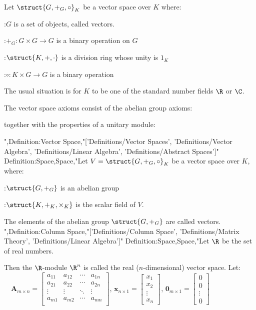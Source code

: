 Let $\struct {G, +_G, \circ}_K$ be a vector space over $K$ where:

:$G$ is a set of objects, called vectors.

:$+_G: G \times G \to G$ is a binary operation on $G$

:$\struct {K, +, \cdot}$ is a division ring whose unity is $1_K$

:$\circ: K \times G \to G$ is a binary operation

The usual situation is for $K$ to be one of the standard number fields $\R$ or $\C$.


The vector space axioms consist of the abelian group axioms:










together with the properties of a unitary module:







",Definition:Vector Space,"['Definitions/Vector Spaces', 'Definitions/Vector Algebra', 'Definitions/Linear Algebra', 'Definitions/Abstract Spaces']"
Definition:Space,Space,"Let $V = \struct {G, +_G, \circ}_K$ be a vector space over $K$, where:

:$\struct {G, +_G}$ is an abelian group

:$\struct {K, +_K, \times_K}$ is the scalar field of $V$.


The elements of the abelian group $\struct {G, +_G}$ are called vectors.
",Definition:Column Space,"['Definitions/Column Space', 'Definitions/Matrix Theory', 'Definitions/Linear Algebra']"
Definition:Space,Space,"Let $\R$ be the set of real numbers.


Then the $\R$-module $\R^n$ is called the real ($n$-dimensional) vector space.
Let:
$\quad \mathbf A_{m \times n} = \begin {bmatrix}
a_{11} & a_{12} & \cdots & a_{1n} \\
a_{21} & a_{22} & \cdots & a_{2n} \\
\vdots & \vdots & \ddots & \vdots \\
a_{m1} & a_{m2} & \cdots & a_{mn} \\
\end {bmatrix}$,  $\mathbf x_{n \times 1} = \begin {bmatrix} x_1 \\ x_2 \\ \vdots \\ x_n \end {bmatrix}$, $\mathbf 0_{m \times 1} = \begin {bmatrix} 0 \\ 0 \\ \vdots \\ 0 \end {bmatrix}$

